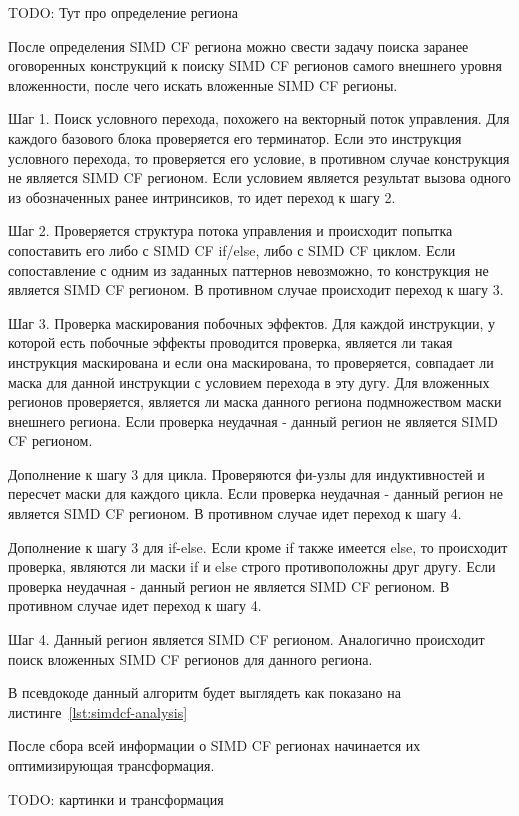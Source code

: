 TODO: Тут про определение региона

После определения SIMD CF региона можно свести задачу поиска заранее оговоренных конструкций к поиску SIMD CF регионов самого внешнего уровня вложенности, после чего искать вложенные SIMD CF регионы.

Шаг 1. Поиск условного перехода, похожего на векторный поток управления. Для
каждого базового блока проверяется его терминатор. Если это инструкция условного
перехода, то проверяется его условие, в противном случае конструкция не является
SIMD CF регионом. Если условием является результат вызова одного из обозначенных
ранее интринсиков, то идет переход к шагу 2.

Шаг 2. Проверяется структура потока управления и происходит попытка сопоставить
его либо с SIMD CF if/else, либо с SIMD CF циклом. Если сопоставление с одним из
заданных паттернов невозможно, то конструкция не является SIMD CF регионом. В
противном случае происходит переход к шагу 3.

Шаг 3. Проверка маскирования побочных эффектов. Для каждой инструкции, у которой
есть побочные эффекты проводится проверка, является ли такая инструкция
маскирована и если она маскирована, то проверяется, совпадает ли маска для
данной инструкции с условием перехода в эту дугу. Для вложенных регионов
проверяется, является ли маска данного региона подмножеством маски внешнего
региона. Если проверка неудачная - данный регион не является SIMD CF регионом.

Дополнение к шагу 3 для цикла. Проверяются фи-узлы для индуктивностей и пересчет
маски для каждого цикла. Если проверка неудачная - данный регион не является
SIMD CF регионом. В противном случае идет переход к шагу 4.

Дополнение к шагу 3 для if-else. Если кроме if также имеется else, то происходит
проверка, являются ли маски if и else строго противоположны друг другу. Если
проверка неудачная - данный регион не является SIMD CF регионом. В противном
случае идет переход к шагу 4.

Шаг 4. Данный регион является SIMD CF регионом. Аналогично происходит поиск
вложенных SIMD CF регионов для данного региона.

В псевдокоде данный алгоритм будет выглядеть как показано на листинге~\ref{lst:simdcf-analysis}

После сбора всей информации о SIMD CF регионах начинается их оптимизирующая трансформация.

TODO: картинки и трансформация
